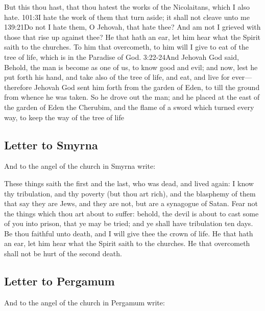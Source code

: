 But this thou hast, that thou hatest the works of the Nicolaitans, which I also hate.%
			{101:3}{I hate the work of them that turn aside; it shall not cleave unto me}%
			{139:21}{Do not I hate them, O Jehovah, that hate thee? And am not I grieved with those that rise up against thee?} %
He that hath an ear, let him hear what the Spirit saith to the churches. To him that overcometh, to him will I give to eat of the tree of life, which is in the Paradise of God.%
				{3:22-24}{And Jehovah God said, Behold, the man is become as one of us, to know good and evil; and now, lest he put forth his hand, and take also of the tree of life, and eat, and live for ever— therefore Jehovah God sent him forth from the garden of Eden, to till the ground from whence he was taken. So he drove out the man; and he placed at the east of the garden of Eden the Cherubim, and the flame of a sword which turned every way, to keep the way of the tree of life}
\subsection*{Letter to Smyrna}
And to the angel of the church in Smyrna write:

These things saith the first and the last, who was dead, and lived again: %
I know thy tribulation, and thy poverty (but thou art rich), and the blasphemy of them that say they are Jews, and they are not, but are a synagogue of Satan. %
Fear not the things which thou art about to suffer: behold, the devil is about to cast some of you into prison, that ye may be tried; and ye shall have tribulation ten days.%
 Be thou faithful unto death, and I will give thee the crown of life. %
He that hath an ear, let him hear what the Spirit saith to the churches. He that overcometh shall not be hurt of the second death.
\subsection*{Letter to Pergamum}
And to the angel of the church in Pergamum write:

